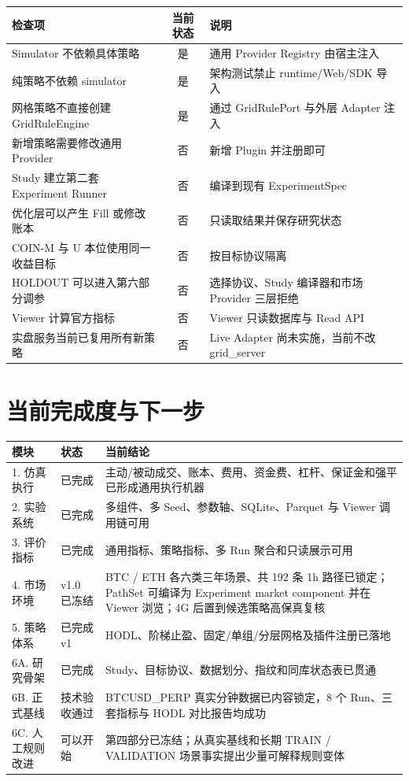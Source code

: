 \documentclass[UTF8,fontset=fandol,11pt,a4paper]{ctexart}
\newcommand{\yes}{\textcolor{StrategyGreen}{是}}
\newcommand{\no}{\textcolor{DangerRed}{否}}
\begin{document}
\noindent\begin{tabularx}{\textwidth}{X c X}
\toprule
检查项 & 当前状态 & 说明 \\
\midrule
Simulator 不依赖具体策略 & \yes & 通用 Provider Registry 由宿主注入 \\
纯策略不依赖 simulator & \yes & 架构测试禁止 runtime/Web/SDK 导入 \\
网格策略不直接创建 GridRuleEngine & \yes & 通过 GridRulePort 与外层 Adapter 注入 \\
新增策略需要修改通用 Provider & \no & 新增 Plugin 并注册即可 \\
Study 建立第二套 Experiment Runner & \no & 编译到现有 ExperimentSpec \\
优化层可以产生 Fill 或修改账本 & \no & 只读取结果并保存研究状态 \\
COIN-M 与 U 本位使用同一收益目标 & \no & 按目标协议隔离 \\
HOLDOUT 可以进入第六部分调参 & \no & 选择协议、Study 编译器和市场 Provider 三层拒绝 \\
Viewer 计算官方指标 & \no & Viewer 只读数据库与 Read API \\
实盘服务当前已复用所有新策略 & \no & Live Adapter 尚未实施，当前不改 grid\_server \\
\bottomrule
\end{tabularx}

\section{当前完成度与下一步}

\noindent\begin{tabularx}{\textwidth}{p{27mm} p{31mm} X}
\toprule
模块 & 状态 & 当前结论 \\
\midrule
1. 仿真执行 & 已完成 & 主动/被动成交、账本、费用、资金费、杠杆、保证金和强平已形成通用执行机器 \\
2. 实验系统 & 已完成 & 多组件、多 Seed、参数轴、SQLite、Parquet 与 Viewer 调用链可用 \\
3. 评价指标 & 已完成 & 通用指标、策略指标、多 Run 聚合和只读展示可用 \\
4. 市场环境 & v1.0 已冻结 & BTC / ETH 各六类三年场景、共 192 条 1h 路径已锁定；PathSet 可编译为 Experiment market component 并在 Viewer 浏览；4G 后置到候选策略高保真复核 \\
5. 策略体系 & 已完成 v1 & HODL、阶梯止盈、固定/单组/分层网格及插件注册已落地 \\
6A. 研究骨架 & 已完成 & Study、目标协议、数据划分、指纹和同库状态表已贯通 \\
6B. 正式基线 & 技术验收通过 & BTCUSD\_PERP 真实分钟数据已内容锁定，8 个 Run、三套指标与 HODL 对比报告均成功 \\
6C. 人工规则改进 & 可以开始 & 第四部分已冻结；从真实基线和长期 TRAIN / VALIDATION 场景事实提出少量可解释规则变体 \\
\bottomrule
\end{tabularx}
\end{document}
